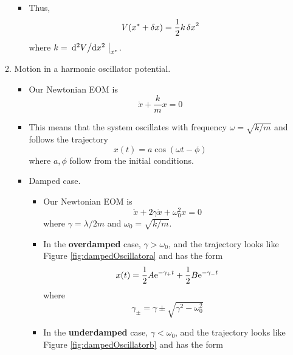 \documentclass[../notes.tex]{subfiles}
\begin{document}
\begin{itemize}
\begin{enumerate}
\begin{itemize}
            \item Thus,
            \begin{equation*}
                V(x^*+\var{x}) = \frac{1}{2}k\var{x}^2
            \end{equation*}
            where $k=\eval{\dv*[2]{V}{x}}_{x^*}$.
        \end{itemize}
        \item Motion in a harmonic oscillator potential.
        \begin{itemize}
            \item Our Newtonian EOM is
            \begin{equation*}
                \ddot{x}+\frac{k}{m}x = 0
            \end{equation*}
            \item This means that the system oscillates with frequency $\omega=\sqrt{k/m}$ and follows the trajectory
            \begin{equation*}
                x(t) = a\cos(\omega t-\phi)
            \end{equation*}
            where $a,\phi$ follow from the initial conditions.
            \item Damped case.
            \begin{itemize}
                \item Our Newtonian EOM is
                \begin{equation*}
                    \ddot{x}+2\gamma\dot{x}+\omega_0^2x = 0
                \end{equation*}
                where $\gamma=\lambda/2m$ and $\omega_0=\sqrt{k/m}$.
                \item In the \textbf{overdamped} case, $\gamma>\omega_0$, and the trajectory looks like Figure \ref{fig:dampedOscillatora} and has the form
                \begin{equation*}
                    x(t) = \frac{1}{2}A\e[-\gamma_+t]+\frac{1}{2}B\e[-\gamma_-t]
                \end{equation*}
                where
                \begin{equation*}
                    \gamma_\pm = \gamma\pm\sqrt{\gamma^2-\omega_0^2}
                \end{equation*}
                \item In the \textbf{underdamped} case, $\gamma<\omega_0$, and the trajectory looks like Figure \ref{fig:dampedOscillatorb} and has the form
                \begin{equation*}

\end{equation*}
\end{itemize}
\end{itemize}
\end{enumerate}
\end{itemize}
\end{document}
